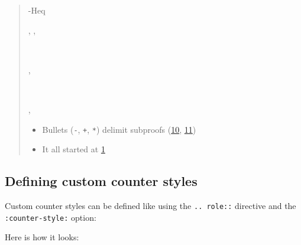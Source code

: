 \documentclass[a4paper]{article}
\begin{document}
\begin{quote}
\begin{alectryon}
\begin{sentence}
\begin{output}
\begin{goals}
\begin{goal}
\begin{hyps}
            \hyp{Heq}{~~~}
          \end{hyps}
          \sep
          \infrule{}
          \sep
          \begin{conclusion}
            ~~~~~~~~
          \end{conclusion}
        \end{goal}
      \end{goals}
    \end{output}
  \end{sentence}
  \sep
  \begin{sentence}
    \begin{input}
      ~~~~\nl
    \end{input}
  \end{sentence}
  \sep
  \begin{sentence}
    \begin{input}
    \end{input}
  \end{sentence}
\end{alectryon}

\begin{itemize}
\item Bullets (\texttt{-}, \texttt{+}, \texttt{*}) delimit subproofs (\hyperref[references-rst-io-setup-s-base-case-0]{10}, \hyperref[references-rst-induction-0]{11})

\item It all started at \hyperref[references-rst-fixpoint-plus-comm-0]{1}
\end{itemize}
\end{quote}


\subsection{Defining custom counter styles%
  \label{defining-custom-counter-styles}%
}

Custom counter styles can be defined like using the \texttt{.. role::} directive and the \texttt{:counter-style:} option:

Here is how it looks:
\end{document}
